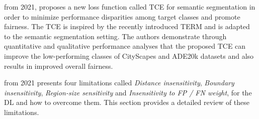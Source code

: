  \cite{DBLP:journals/corr/abs-2103-14051} from 2021, proposes a new loss function called \ac{TCE} for semantic segmentation in order to minimize performance disparities among target classes and promote fairness. The \ac{TCE} is inspired by the recently introduced \ac{TERM}\cite{li2020tilted} and is adapted to the semantic segmentation setting. The authors demonstrate through quantitative and qualitative performance analyses that the proposed \ac{TCE} can improve the low-performing classes of CityScapes \cite{cordts2016cityscapes} and ADE20k \cite{zhou2017scene} datasets and also results in improved overall fairness.

 \cite{9338261} from 2021 presents four limitations called \emph{Distance insensitivity}, \emph{Boundary insensitivity}, \emph{Region-size sensitivity} and \emph{Insensitivity to FP / FN weight}, for the \ac{DL} and how to overcome them. This section provides a detailed review of these limitations.

